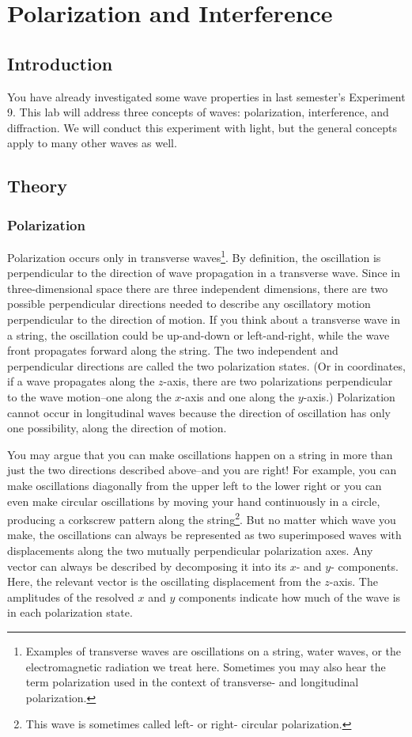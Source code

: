 \chapter{Polarization and Interference}
\section{Introduction}
You have already investigated some wave properties in last semester's Experiment 9. This lab will address three concepts of waves: polarization, interference, and diffraction. We will conduct this experiment with light, but the general concepts apply to many other waves as well.

\section{Theory}
\subsection{Polarization}
Polarization occurs only in transverse waves\footnote{Examples of transverse waves are oscillations on a string, water waves, or the electromagnetic radiation we treat here. Sometimes you may also hear the term polarization used in the context of transverse- and longitudinal polarization.}. By definition, the oscillation is perpendicular to the direction of wave propagation in a transverse wave. Since in three-dimensional space there are three independent dimensions, there are two possible perpendicular directions needed to describe any oscillatory motion perpendicular to the direction of motion. If you think about a transverse wave in a string, the oscillation could be up-and-down or left-and-right, while the wave front propagates forward along the string. The two independent and perpendicular directions are called the two polarization states. (Or in coordinates, if a wave propagates along the $z$-axis, there are two polarizations perpendicular to the wave motion--one along the $x$-axis and one along the $y$-axis.) Polarization cannot occur in longitudinal waves because the direction of oscillation has only one possibility, along the direction of motion.\myskip

You may argue that you can make oscillations happen on a string in more than just the two directions described above--and you are right! For example, you can make oscillations diagonally from the upper left to the lower right or you can even make circular oscillations by moving your hand continuously in a circle, producing a corkscrew pattern along the string\footnote{This wave is sometimes called left- or right- circular polarization.}. But no matter which wave you make, the oscillations can always be represented as two superimposed waves with displacements along the two mutually perpendicular polarization axes. Any vector can always be described by decomposing it into its $x$- and $y$- components. Here, the relevant vector is the oscillating displacement from the $z$-axis. The amplitudes of the resolved $x$ and $y$ components indicate how much of the wave is in each polarization state.\myskip

